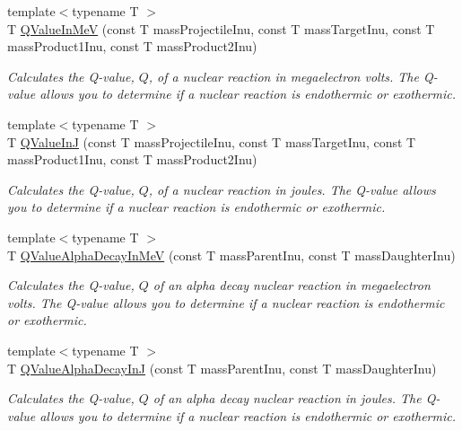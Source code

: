 \begin{DoxyCompactItemize}
{\footnotesize template$<$typename T $>$ }\\T \mbox{\hyperlink{group___e_g_x_phys-_q_value_gab96ade2d74f5303e30a43ff97bd03841}{Q\+Value\+In\+MeV}} (const T mass\+Projectile\+Inu, const T mass\+Target\+Inu, const T mass\+Product1\+Inu, const T mass\+Product2\+Inu)
\begin{DoxyCompactList}\small\item\em Calculates the Q-\/value, $Q$, of a nuclear reaction in megaelectron volts. The Q-\/value allows you to determine if a nuclear reaction is endothermic or exothermic. \end{DoxyCompactList}\item 
{\footnotesize template$<$typename T $>$ }\\T \mbox{\hyperlink{group___e_g_x_phys-_q_value_ga4b23be4fb0a3a9e7229c95377afc74b5}{Q\+Value\+InJ}} (const T mass\+Projectile\+Inu, const T mass\+Target\+Inu, const T mass\+Product1\+Inu, const T mass\+Product2\+Inu)
\begin{DoxyCompactList}\small\item\em Calculates the Q-\/value, $Q$, of a nuclear reaction in joules. The Q-\/value allows you to determine if a nuclear reaction is endothermic or exothermic. \end{DoxyCompactList}\item 
{\footnotesize template$<$typename T $>$ }\\T \mbox{\hyperlink{group___e_g_x_phys-_q_value-_alpha_ga4f9a38d3ad4bf93471a0affb493b6e72}{Q\+Value\+Alpha\+Decay\+In\+MeV}} (const T mass\+Parent\+Inu, const T mass\+Daughter\+Inu)
\begin{DoxyCompactList}\small\item\em Calculates the Q-\/value, $Q$ of an alpha decay nuclear reaction in megaelectron volts. The Q-\/value allows you to determine if a nuclear reaction is endothermic or exothermic. \end{DoxyCompactList}\item 
{\footnotesize template$<$typename T $>$ }\\T \mbox{\hyperlink{group___e_g_x_phys-_q_value-_alpha_gab8a50c18f6de3c1b6ed280c26c3ff3a5}{Q\+Value\+Alpha\+Decay\+InJ}} (const T mass\+Parent\+Inu, const T mass\+Daughter\+Inu)
\begin{DoxyCompactList}\small\item\em Calculates the Q-\/value, $Q$ of an alpha decay nuclear reaction in joules. The Q-\/value allows you to determine if a nuclear reaction is endothermic or exothermic. \end{DoxyCompactList}\item 

\end{DoxyCompactItemize}
